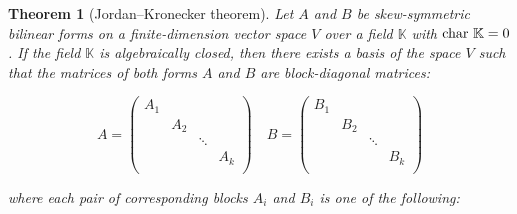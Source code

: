 \documentclass[12pt]{article}
\newtheorem{theorem}[lemma]{Theorem}
\theoremstyle{definition}
\begin{document}
\begin{theorem}[Jordan--Kronecker theorem]\label{T:Jordan-Kronecker_theorem}
Let $A$ and $B$ be skew-symmetric bilinear forms on a
finite-dimension vector space $V$ over a field $\mathbb{K}$ with $\textmd{char }  \mathbb{K} =0$. If the field $\mathbb{K}$
is algebraically closed, then there exists a basis of the space $V$
such that the matrices of both forms $A$ and $B$ are block-diagonal
matrices:

{\footnotesize
$$
A =
\begin{pmatrix}
A_1 &     &        &      \\
    & A_2 &        &      \\
    &     & \ddots &      \\
    &     &        & A_k  \\
\end{pmatrix}
\quad  B=
\begin{pmatrix}
B_1 &     &        &      \\
    & B_2 &        &      \\
    &     & \ddots &      \\
    &     &        & B_k  \\
\end{pmatrix}
$$
}

where each pair of corresponding blocks $A_i$ and $B_i$ is one of
the following:







\begin{itemize}


\end{itemize}
\end{theorem}
\end{document}

